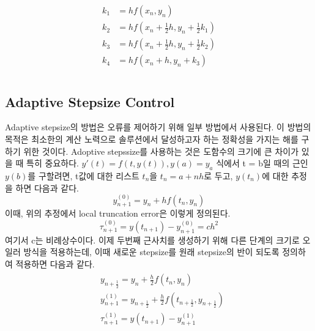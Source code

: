 \documentclass[11pt]{article}
\begin{document}
\begin{equation}
\begin{split}
\begin{aligned}
k_1 &= h f(x_n, y_n) \\
k_2 &= h f\left(x_n + \frac{1}{2}h, y_n + \frac{1}{2}k_1\right) \\
k_3 &= h f\left(x_n + \frac{1}{2}h, y_n + \frac{1}{2}k_2\right) \\
k_4 &= h f\left(x_n + h, y_n + k_3\right) \\
\end{aligned}
\end{split}
\end{equation}











\subsection{Adaptive Stepsize Control}
Adaptive stepsize의 방법은 오류를 제어하기 위해 일부 방법에서 사용된다. 이 방법의 목적은 최소한의 계산 노력으로 솔루션에서 달성하고자 하는 정확성을 가지는 해를 구하기 위한 것이다. Adoptive stepssize를 사용하는 것은 도함수의 크기에 큰 차이가 있을 때 특히 중요하다. $y'(t) = f(t, y(t))
,y(a) = y_a$ 식에서 t = b일 때의 근인 $y(b)$를 구할려면, t값에 대한 리스트 $t_{n}$을 $t_{n} = a + nh$로 두고, $y(t_{n})$에 대한 추정을 하면 다음과 같다.
\begin{equation}
y_{{n+1}}^{{(0)}}=y_{n}+hf(t_{n},y_{n})
\end{equation}
이때, 위의 추정에서 local truncation error은 이렇게 정의된다.
\begin{equation}
\tau _{n+1}^{(0)}=y(t_{n+1})-y_{n+1}^{(0)} = ch^2
\end{equation}
여기서 c는 비례상수이다. 이제 두번째 근사치를 생성하기 위해 다른 단계의 크기로 오일러 방식을 적용하는데, 이때 새로운 stepsize를 원래 stepsize의 반이 되도록 정의하여 적용하면 다음과 같다.
\begin{equation}
\begin{split}
\begin{aligned}
& y_{{n+{\frac{1}{2}}}}=y_{n}+{\frac{h}{2}}f(t_{n},y_{n}) \\
& y_{{n+1}}^{{(1)}}=y_{{n+{\frac{1}{2}}}}+{\frac{h}{2}}f\left(t_{{n+{\frac{1}{2}}}},y_{{n+{\frac{1}{2}}}}\right) \\
& \tau_{{n+1}}^{{(1)}} = y(t_{n + 1}) - y_{{n+1}}^{{(1)}} \\
\end{aligned}
\end{split}
\end{equation}
\end{document}

